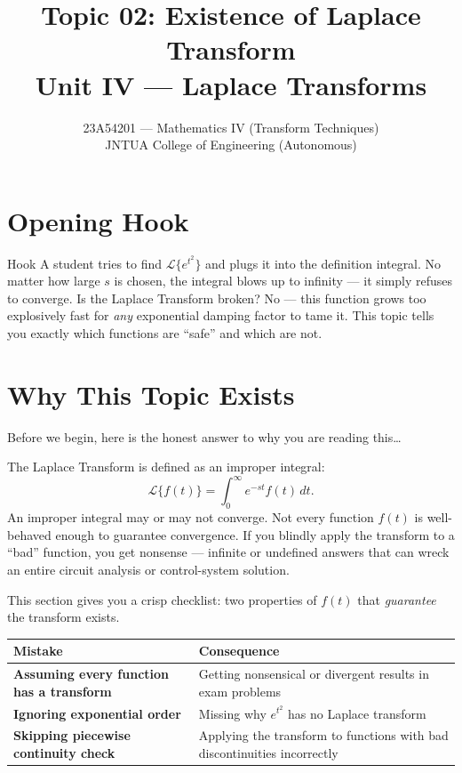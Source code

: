 \documentclass[12pt,a4paper]{article}
\title{Topic 02: Existence of Laplace Transform \\ \large Unit IV --- Laplace Transforms}
\author{23A54201 --- Mathematics IV (Transform Techniques) \\ JNTUA College of Engineering (Autonomous)}
\date{}
\begin{document}
\maketitle
\tableofcontents
\newpage

\section{Opening Hook}

\begin{curiositybox}{Hook}
A student tries to find $\mathcal{L}\{e^{t^2}\}$ and plugs it into the definition integral. No matter how large $s$ is chosen, the integral blows up to infinity --- it simply refuses to converge. Is the Laplace Transform broken? No --- this function grows too explosively fast for \emph{any} exponential damping factor to tame it. This topic tells you exactly which functions are ``safe'' and which are not.
\end{curiositybox}

\section{Why This Topic Exists}

Before we begin, here is the honest answer to why you are reading this\ldots

The Laplace Transform is defined as an improper integral:
\[
  \mathcal{L}\{f(t)\} = \int_0^{\infty} e^{-st} f(t)\, dt.
\]
An improper integral may or may not converge. Not every function $f(t)$ is well-behaved enough to guarantee convergence. If you blindly apply the transform to a ``bad'' function, you get nonsense --- infinite or undefined answers that can wreck an entire circuit analysis or control-system solution.

This section gives you a crisp checklist: two properties of $f(t)$ that \emph{guarantee} the transform exists.

\begin{center}
\begin{tabular}{>{\bfseries}p{6cm} p{7cm}}
\toprule
Mistake & Consequence \\
\midrule
Assuming every function has a transform & Getting nonsensical or divergent results in exam problems \\
Ignoring exponential order & Missing why $e^{t^2}$ has no Laplace transform \\
Skipping piecewise continuity check & Applying the transform to functions with bad discontinuities incorrectly \\
\bottomrule
\end{tabular}
\end{center}
\end{document}
